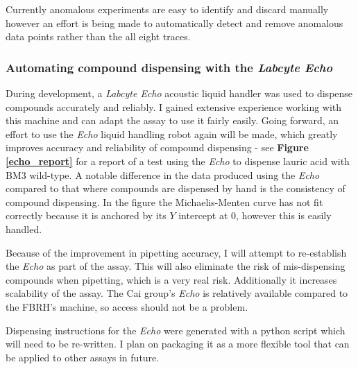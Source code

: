 \documentclass{article}
\begin{document}
\par
Currently anomalous experiments are easy to identify and discard manually however an effort is being made to automatically detect and remove anomalous data points rather than the all eight traces. %

\subsubsection{Automating compound dispensing with the \textit{Labcyte Echo}}
During development, a \textit{Labcyte Echo} acoustic liquid handler was used to dispense compounds accurately and reliably. I gained extensive experience working with this machine  and can adapt the assay to use it fairly easily. Going forward, an effort to use the \textit{Echo} liquid handling robot again will be made, which greatly improves accuracy and reliability of compound dispensing - see \textbf{Figure \ref{echo_report}} for a report of a test using the \textit{Echo} to dispense lauric acid with BM3 wild-type. A notable difference in the data produced using the \textit{Echo} compared to that where compounds are dispensed by hand is the consistency of compound dispensing. In the figure the Michaelis-Menten curve has not fit correctly because it is anchored by its $Y$ intercept at 0, however this is easily handled.  %
\par
Because of the improvement in pipetting accuracy, I will attempt to re-establish the \textit{Echo} as part of the assay. This will also eliminate the risk of mis-dispensing compounds when pipetting, which is a very real risk. Additionally it increases scalability of the assay.
The Cai group's \textit{Echo} is relatively available compared to the FBRH's machine, so access should not be a problem. 
\par
Dispensing instructions for the \textit{Echo} were generated with a python script which will need to be re-written. I plan on packaging it as a more flexible tool that can be applied to other assays in future.
 
\end{document}
